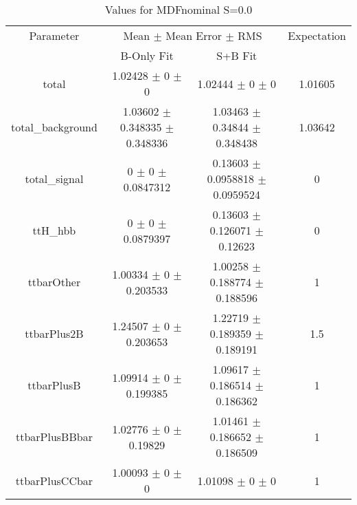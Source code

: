 \begin{table}
\centering
\caption{Values for MDFnominal S=0.0}
\begin{tabular}{cccc}
\toprule
Parameter & \multicolumn{2}{c}{Mean $\pm$ Mean Error $\pm$ RMS} & Expectation\\
 & B-Only Fit & S+B Fit & \\
\midrule
total & \num{1.02428} $\pm$ \num{0} $\pm$ \num{0} & \num{1.02444} $\pm$ \num{0} $\pm$ \num{0} & \num{1.01605}\\
total\_background & \num{1.03602} $\pm$ \num{0.348335} $\pm$ \num{0.348336} & \num{1.03463} $\pm$ \num{0.34844} $\pm$ \num{0.348438} & \num{1.03642}\\
total\_signal & \num{0} $\pm$ \num{0} $\pm$ \num{0.0847312} & \num{0.13603} $\pm$ \num{0.0958818} $\pm$ \num{0.0959524} & \num{0}\\
ttH\_hbb & \num{0} $\pm$ \num{0} $\pm$ \num{0.0879397} & \num{0.13603} $\pm$ \num{0.126071} $\pm$ \num{0.12623} & \num{0}\\
ttbarOther & \num{1.00334} $\pm$ \num{0} $\pm$ \num{0.203533} & \num{1.00258} $\pm$ \num{0.188774} $\pm$ \num{0.188596} & \num{1}\\
ttbarPlus2B & \num{1.24507} $\pm$ \num{0} $\pm$ \num{0.203653} & \num{1.22719} $\pm$ \num{0.189359} $\pm$ \num{0.189191} & \num{1.5}\\
ttbarPlusB & \num{1.09914} $\pm$ \num{0} $\pm$ \num{0.199385} & \num{1.09617} $\pm$ \num{0.186514} $\pm$ \num{0.186362} & \num{1}\\
ttbarPlusBBbar & \num{1.02776} $\pm$ \num{0} $\pm$ \num{0.19829} & \num{1.01461} $\pm$ \num{0.186652} $\pm$ \num{0.186509} & \num{1}\\
ttbarPlusCCbar & \num{1.00093} $\pm$ \num{0} $\pm$ \num{0} & \num{1.01098} $\pm$ \num{0} $\pm$ \num{0} & \num{1}\\
\bottomrule
\end{tabular}
\end{table}